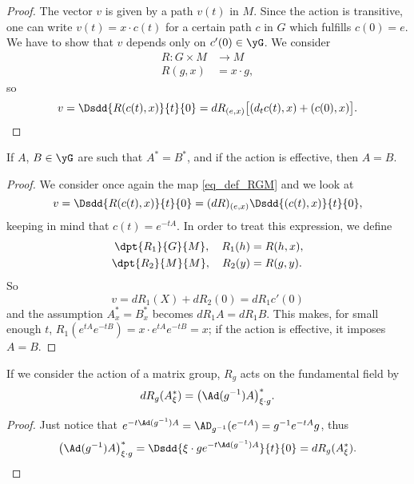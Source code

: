 \begin{proof}
The vector $v$ is given by a path $v(t)$ in $M$. Since the action is transitive, one can write $v(t)=x\cdot c(t)$ for a certain path $c$ in $G$ which fulfills $c(0)=e$. We have to show that $v$ depends only on $c'(0)\in\yG$. We consider
\begin{equation}  \label{eq_def_RGM}
\begin{aligned}
 R\colon G\times M&\to M \\
R(g,x)&= x\cdot g,
\end{aligned}
\end{equation}
so
\begin{equation}\label{eq:v_Rc}
   v=\Dsdd{ R(c(t),x) }{t}{0}=dR_{(e,x)}\big[  (d_tc(t),x)+(c(0),x)   \big].
\end{equation}

\end{proof}



\begin{lemma}
If $A$, $B\in\yG$ are such that $A^*=B^*$, and if the action is effective, then $A=B$.
\label{lem:As_Bs_A_B}
\end{lemma}

\begin{proof}
 We consider once again the map \eqref{eq_def_RGM} and we look at
\[
  v=\Dsdd{ R(c(t),x) }{t}{0}
   =(dR)_{(e,x)}\Dsdd{ (c(t),x) }{t}{0},
\]
keeping in mind that $c(t)=e^{-tA}$. In order to treat this expression, we define
\begin{subequations}
\begin{align}
  \dpt{R_1}{G}{M},\quad  R_1(h)&=R(h,x),\\
  \dpt{R_2}{M}{M},\quad  R_2(y)&=R(g,y).
\end{align}
\end{subequations}
So
\[
  v=dR_1(X)+dR_2(0)=dR_1c'(0)
\]
and the assumption $A^*_x=B^*_x$ becomes $dR_1 A=dR_1 B$. This makes, for small enough $t$, $R_1(e^{tA}e^{-tB})=x\cdot e^{tA}e^{-tB}=x$; if the action is effective, it imposes $A=B$.
\end{proof}

\begin{lemma}
If we consider the action of a matrix group, $R_g$ acts on the fundamental field by
\[
  dR_g(A^*_{\xi})=\big( \Ad(g^{-1})A \big)^*_{\xi\cdot g}.
\]
\label{lem:dRgAstar}
\end{lemma}

\begin{proof}
Just notice that $e^{-t\Ad(g^{-1})A}=\AD_{g^{-1}}(e^{-tA})=g^{-1} e^{-tA}g$, thus
\begin{equation}
  \big( \Ad(g^{-1})A \big)^*_{\xi\cdot g}=\Dsdd{ \xi\cdot ge^{-t\Ad(g^{-1})A} }{t}{0}=dR_g(A^*_{\xi}).
\end{equation}
\end{proof}

